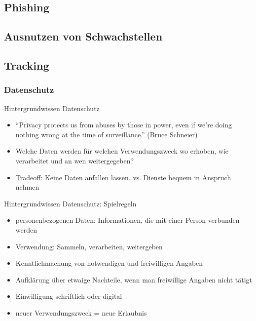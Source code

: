 \documentclass[utf8]{beamer}
\begin{document}
	\subsection{Phishing}
	
	
	\subsection{Ausnutzen von Schwachstellen}
	
	\subsection{Tracking}
	\subsubsection{Datenschutz}
	\begin{frame}{Hintergrundwissen Datenschutz} 
		\begin{itemize}
			\item “Privacy protects us from abuses by those in power, even if we’re doing nothing wrong at the time of surveillance.” (Bruce Schneier)
			\item Welche Daten werden für welchen Verwendungszweck wo erhoben, wie verarbeitet und an wen weitergegeben?
			\item Tradeoff: Keine Daten anfallen lassen. vs. Dienste bequem in Anspruch nehmen
		\end{itemize}
	\end{frame}
	
	\begin{frame}{Hintergrundwissen Datenschutz: Spielregeln}
		\begin{itemize}
			\item personenbezogenen Daten: Informationen, die mit einer Person verbunden werden
			\item Verwendung: Sammeln, verarbeiten, weitergeben
			\item Kenntlichmachung von notwendigen und freiwilligen Angaben
			\item Aufklärung über etwaige Nachteile, wenn man freiwillige Angaben nicht tätigt
			\item Einwilligung schriftlich oder digital
			\item neuer Verwendungszweck = neue Erlaubnis
		\end{itemize}
	\end{frame}
	
\end{document}
